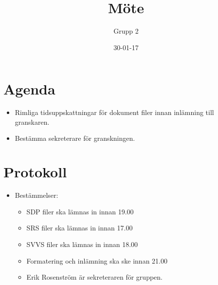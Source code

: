 \documentclass[paper=a4, fontsize=11pt,twoside]{article}
\title{Möte}
\author{Grupp 2}
\date{30-01-17}
\begin{document}
\maketitle	


\section{Agenda}

\begin{itemize}
  \item Rimliga tidsuppskattningar för dokument filer innan inlämning till granskaren.
  \item Bestämma sekreterare för granskningen.
\end{itemize}

\section{Protokoll}

\begin{itemize}
  \item Bestämmelser:
  	\begin{itemize}
  	\item SDP filer ska lämnas in innan 19.00
    \item SRS filer ska lämnas in innan 17.00
    \item SVVS filer ska lämnas in innan 18.00
    \item Formatering och inlämning ska ske innan 21.00 
    \item Erik Rosenström är sekreteraren för gruppen.
	\end{itemize}
\end{itemize}
\end{document}
